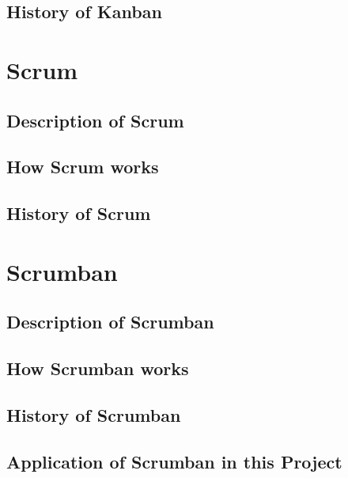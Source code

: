 \subsection{History of Kanban}

\section{Scrum}
\subsection{Description of Scrum}
\subsection{How Scrum works}
\subsection{History of Scrum}

\section{Scrumban}
\subsection{Description of Scrumban}
\subsection{How Scrumban works}
\subsection{History of Scrumban}
\subsection{Application of Scrumban in this Project}